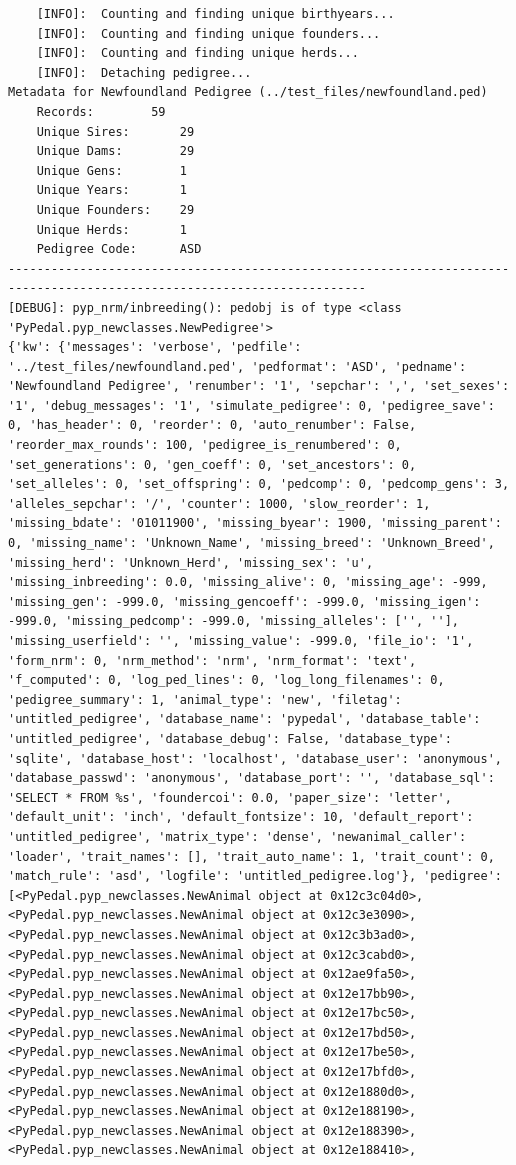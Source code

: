 \documentclass[
  letterpaper,
  DIV=11,
  numbers=noendperiod]{scrreprt}
\begin{document}
\begin{codelisting}
{\begin{verbatim}
    [INFO]:  Counting and finding unique birthyears...
    [INFO]:  Counting and finding unique founders...
    [INFO]:  Counting and finding unique herds...
    [INFO]:  Detaching pedigree...
Metadata for Newfoundland Pedigree (../test_files/newfoundland.ped)
    Records:        59
    Unique Sires:       29
    Unique Dams:        29
    Unique Gens:        1
    Unique Years:       1
    Unique Founders:    29
    Unique Herds:       1
    Pedigree Code:      ASD
------------------------------------------------------------------------------------------------------------------------
[DEBUG]: pyp_nrm/inbreeding(): pedobj is of type <class 'PyPedal.pyp_newclasses.NewPedigree'>
{'kw': {'messages': 'verbose', 'pedfile': '../test_files/newfoundland.ped', 'pedformat': 'ASD', 'pedname': 'Newfoundland Pedigree', 'renumber': '1', 'sepchar': ',', 'set_sexes': '1', 'debug_messages': '1', 'simulate_pedigree': 0, 'pedigree_save': 0, 'has_header': 0, 'reorder': 0, 'auto_renumber': False, 'reorder_max_rounds': 100, 'pedigree_is_renumbered': 0, 'set_generations': 0, 'gen_coeff': 0, 'set_ancestors': 0, 'set_alleles': 0, 'set_offspring': 0, 'pedcomp': 0, 'pedcomp_gens': 3, 'alleles_sepchar': '/', 'counter': 1000, 'slow_reorder': 1, 'missing_bdate': '01011900', 'missing_byear': 1900, 'missing_parent': 0, 'missing_name': 'Unknown_Name', 'missing_breed': 'Unknown_Breed', 'missing_herd': 'Unknown_Herd', 'missing_sex': 'u', 'missing_inbreeding': 0.0, 'missing_alive': 0, 'missing_age': -999, 'missing_gen': -999.0, 'missing_gencoeff': -999.0, 'missing_igen': -999.0, 'missing_pedcomp': -999.0, 'missing_alleles': ['', ''], 'missing_userfield': '', 'missing_value': -999.0, 'file_io': '1', 'form_nrm': 0, 'nrm_method': 'nrm', 'nrm_format': 'text', 'f_computed': 0, 'log_ped_lines': 0, 'log_long_filenames': 0, 'pedigree_summary': 1, 'animal_type': 'new', 'filetag': 'untitled_pedigree', 'database_name': 'pypedal', 'database_table': 'untitled_pedigree', 'database_debug': False, 'database_type': 'sqlite', 'database_host': 'localhost', 'database_user': 'anonymous', 'database_passwd': 'anonymous', 'database_port': '', 'database_sql': 'SELECT * FROM %s', 'foundercoi': 0.0, 'paper_size': 'letter', 'default_unit': 'inch', 'default_fontsize': 10, 'default_report': 'untitled_pedigree', 'matrix_type': 'dense', 'newanimal_caller': 'loader', 'trait_names': [], 'trait_auto_name': 1, 'trait_count': 0, 'match_rule': 'asd', 'logfile': 'untitled_pedigree.log'}, 'pedigree': [<PyPedal.pyp_newclasses.NewAnimal object at 0x12c3c04d0>, <PyPedal.pyp_newclasses.NewAnimal object at 0x12c3e3090>, <PyPedal.pyp_newclasses.NewAnimal object at 0x12c3b3ad0>, <PyPedal.pyp_newclasses.NewAnimal object at 0x12c3cabd0>, <PyPedal.pyp_newclasses.NewAnimal object at 0x12ae9fa50>, <PyPedal.pyp_newclasses.NewAnimal object at 0x12e17bb90>, <PyPedal.pyp_newclasses.NewAnimal object at 0x12e17bc50>, <PyPedal.pyp_newclasses.NewAnimal object at 0x12e17bd50>, <PyPedal.pyp_newclasses.NewAnimal object at 0x12e17be50>, <PyPedal.pyp_newclasses.NewAnimal object at 0x12e17bfd0>, <PyPedal.pyp_newclasses.NewAnimal object at 0x12e1880d0>, <PyPedal.pyp_newclasses.NewAnimal object at 0x12e188190>, <PyPedal.pyp_newclasses.NewAnimal object at 0x12e188390>, <PyPedal.pyp_newclasses.NewAnimal object at 0x12e188410>, 
\end{verbatim}}
\end{codelisting}
\end{document}
